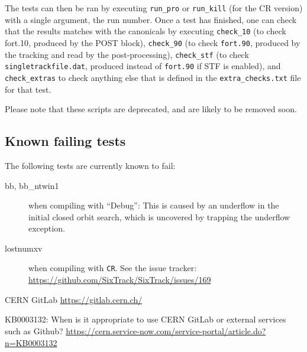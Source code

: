 \documentclass[english,BCOR=0mm,DIV=18]{scrartcl}
\begin{document}
The tests can then be ran by executing \texttt{run\_pro} or \texttt{run\_kill} (for the CR version) with a single argument, the run number.
Once a test has finished, one can check that the results matches with the canonicals by executing \texttt{check\_10} (to check fort.10, produced by the POST block), \texttt{check\_90} (to check \texttt{fort.90}, produced by the tracking and read by the post-processing), \texttt{check\_stf} (to check \texttt{singletrackfile.dat}, produced instead of \texttt{fort.90} if STF is enabled), and \texttt{check\_extras} to check anything else that is defined in the \texttt{extra\_checks.txt} file for that test.

Please note that these scripts are deprecated, and are likely to be removed soon.

\subsection{Known failing tests}
The following tests are currently known to fail:
\begin{description}
\item[bb, bb\_ntwin1] when compiling with ``Debug'': This is caused by an underflow in the initial closed orbit search, which is uncovered by trapping the underflow exception.
\item[lostnumxv] when compiling with \texttt{CR}. See the issue tracker: \url{https://github.com/SixTrack/SixTrack/issues/169}
\end{description}

\begin{thebibliography}{2}

 CERN GitLab \url{https://gitlab.cern.ch/}

 KB0003132: When is it appropriate to use CERN GitLab or external services such as Github? \url{https://cern.service-now.com/service-portal/article.do?n=KB0003132}

\end{thebibliography}
\end{document}
